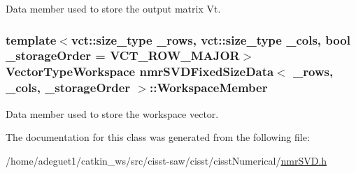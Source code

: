 Data member used to store the output matrix Vt. \hypertarget{classnmr_s_v_d_fixed_size_data_a2821e6d6be56a77b1584b9994d7b1a83}{
\subsubsection[{Workspace\-Member}]{\setlength{\rightskip}{0pt plus 5cm}template$<$vct\-::size\-\_\-type \-\_\-rows, vct\-::size\-\_\-type \-\_\-cols, bool \-\_\-storage\-Order = V\-C\-T\-\_\-\-R\-O\-W\-\_\-\-M\-A\-J\-O\-R$>$ {\bf Vector\-Type\-Workspace} {\bf nmr\-S\-V\-D\-Fixed\-Size\-Data}$<$ \-\_\-rows, \-\_\-cols, \-\_\-storage\-Order $>$\-::Workspace\-Member\hspace{0.3cm}{\ttfamily [protected]}}}\label{classnmr_s_v_d_fixed_size_data_a2821e6d6be56a77b1584b9994d7b1a83}
Data member used to store the workspace vector. 

The documentation for this class was generated from the following file\-:\begin{DoxyCompactItemize}
\item 
/home/adeguet1/catkin\-\_\-ws/src/cisst-\/saw/cisst/cisst\-Numerical/\hyperlink{nmr_s_v_d_8h}{nmr\-S\-V\-D.\-h}\end{DoxyCompactItemize}
